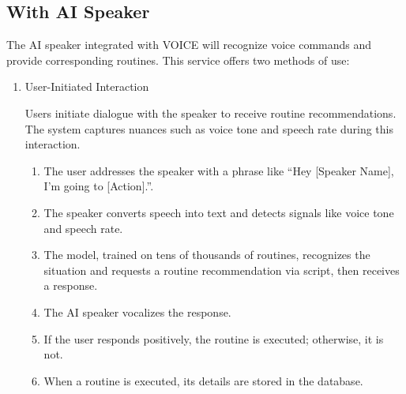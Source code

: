 \documentclass[conference]{IEEEtran}
\begin{document}
\subsection{With AI Speaker}
The AI speaker integrated with VOICE will recognize voice commands and provide corresponding routines. This service offers two methods of use:
\vspace{0.5em}

\begin{enumerate}[label=\arabic*]
    \item User-Initiated Interaction\par
    \vspace{0.3em}
    Users initiate dialogue with the speaker to receive routine recommendations. The system captures nuances such as voice tone and speech rate during this interaction.
    \vspace{0.3em}

    \begin{enumerate}[label=\arabic*)]
        \item The user addresses the speaker with a phrase like “Hey [Speaker Name], I'm going to [Action].”.

        \vspace{0.5em}

        \item The speaker converts speech into text and detects signals like voice tone and speech rate.

        \vspace{0.5em}

        \item The model, trained on tens of thousands of routines, recognizes the situation and requests a routine recommendation via script, then receives a response.

        \vspace{0.5em}

        \item The AI speaker vocalizes the response.

        \vspace{0.5em}

        \item If the user responds positively, the routine is executed; otherwise, it is not. 

        \vspace{0.5em}

        \item When a routine is executed, its details are stored in the database.
    \end{enumerate}


\end{enumerate}
\end{document}

